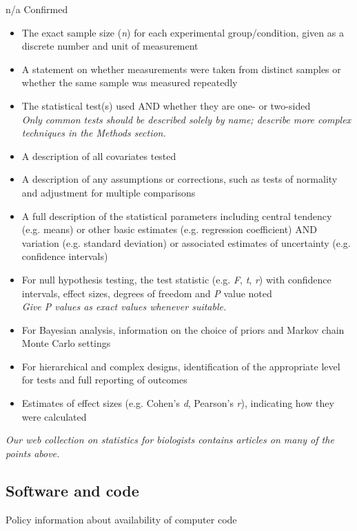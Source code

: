 \documentclass{article}
\begin{document}
\noindent n/a \quad Confirmed\par
\begin{itemize}
\item[{[ ] [x]}] The exact sample size (\emph{n}) for each experimental group/condition, given as a discrete number and unit of measurement
\item[{[ ] [x]}] A statement on whether measurements were taken from distinct samples or whether the same sample was measured repeatedly
\item[{[ ] [x]}] The statistical test(s) used AND whether they are one- or two-sided\\ \emph{Only common tests should be described solely by name; describe more complex techniques in the Methods section.}
\item[{[x] [ ]}] A description of all covariates tested
\item[{[ ] [x]}] A description of any assumptions or corrections, such as tests of normality and adjustment for multiple comparisons
\item[{[ ] [x]}] A full description of the statistical parameters including central tendency (e.g. means) or other basic estimates (e.g. regression coefficient) AND variation (e.g. standard deviation) or associated estimates of uncertainty (e.g. confidence intervals)
\item[{[ ] [x]}] For null hypothesis testing, the test statistic (e.g. \emph{F}, \emph{t}, \emph{r}) with confidence intervals, effect sizes, degrees of freedom and \emph{P} value noted\\ \emph{Give P values as exact values whenever suitable.}
\item[{[x] [ ]}] For Bayesian analysis, information on the choice of priors and Markov chain Monte Carlo settings
\item[{[x] [ ]}] For hierarchical and complex designs, identification of the appropriate level for tests and full reporting of outcomes
\item[{[x] [ ]}] Estimates of effect sizes (e.g. Cohen's \emph{d}, Pearson's \emph{r}), indicating how they were calculated
\end{itemize}
\begin{center}\small\emph{Our web collection on statistics for biologists contains articles on many of the points above.}\end{center}

\subsection*{Software and code}
Policy information about availability of computer code
\end{document}
